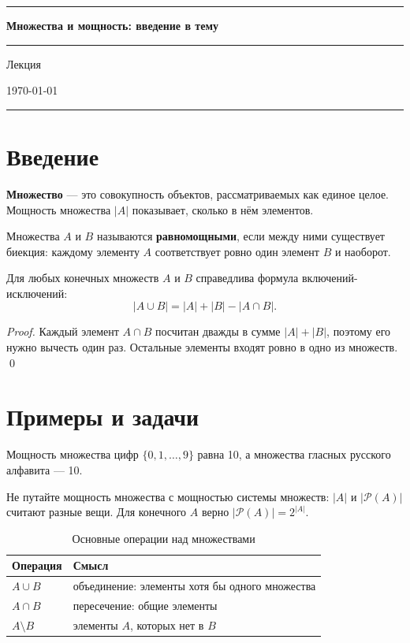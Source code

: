 \documentclass[11pt,a4paper]{article}
\newcommand{\term}[1]{\textcolor{primary}{\textbf{#1}}}
\newcommand{\universumdoctype}{Лекция}
\newcommand{\makelecturetitle}[2][]{%
\begin{titlepage}
\centering
{\color{primary}\rule{\linewidth}{2pt}}\par
\vspace{1.6cm}
{\Huge\bfseries\sffamily #2\par}
\vspace{0.6cm}
{\color{secondary}\rule{5cm}{0.8pt}}\par
\vspace{0.7cm}
{\Large\sffamily\universumdoctype\par}
\ifstrempty{#1}{}{%
  \vspace{0.6cm}%
  {\normalsize\color{textgray} #1\par}%
}
\vfill
{\large \today\par}
\vspace{0.6cm}
{\color{primary}\rule{\linewidth}{0.6pt}}
\end{titlepage}
}
\begin{document}
\makelecturetitle{Множества и мощность: введение в тему}

\tableofcontents

\section{Введение}

\term{Множество} — это совокупность объектов, рассматриваемых как единое целое.
Мощность множества $|A|$ показывает, сколько в нём элементов.

\begin{definition}
Множества $A$ и $B$ называются \term{равномощными}, если между ними существует
биекция: каждому элементу $A$ соответствует ровно один элемент $B$ и наоборот.
\end{definition}

\begin{theorem}
Для любых конечных множеств $A$ и $B$ справедлива формула включений-исключений:
\[ |A \cup B| = |A| + |B| - |A \cap B|. \]
\end{theorem}

\begin{proof}
Каждый элемент $A \cap B$ посчитан дважды в сумме $|A| + |B|$, поэтому его нужно
вычесть один раз. Остальные элементы входят ровно в одно из множеств.
\qed
\end{proof}

\section{Примеры и задачи}

\begin{example}
Мощность множества цифр $\{0, 1, \ldots, 9\}$ равна 10, а множества гласных
русского алфавита — 10.
\end{example}

\begin{important}
Не путайте мощность множества с мощностью системы множеств: $|A|$ и $|\mathcal{P}(A)|$
считают разные вещи. Для конечного $A$ верно $|\mathcal{P}(A)| = 2^{|A|}$.
\end{important}

\begin{table}[h]
\centering
\begin{tabularx}{0.8\linewidth}{lX}
\toprule
Операция & Смысл \\
\midrule
$A \cup B$ & объединение: элементы хотя бы одного множества \\
$A \cap B$ & пересечение: общие элементы \\
$A \setminus B$ & элементы $A$, которых нет в $B$ \\
\bottomrule
\end{tabularx}
\caption{Основные операции над множествами}
\end{table}
\end{document}
